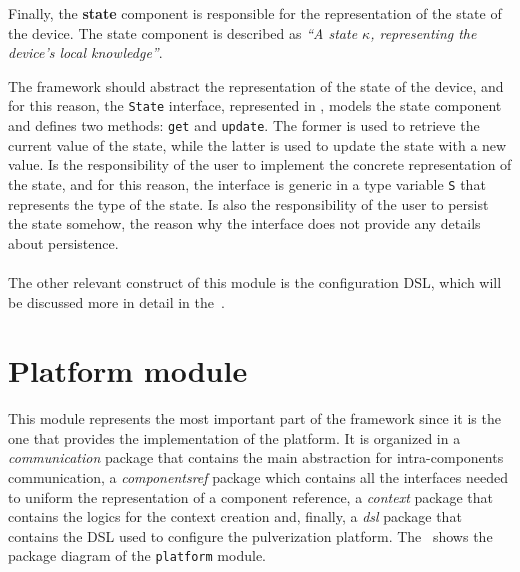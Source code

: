 Finally, the \textbf{state} component is responsible for the representation of the state of the device.
The state component is described as \textit{``A state $\kappa$, representing the device's local knowledge''}.



The framework should abstract the representation of the state of the device, and for this reason, the \texttt{State} interface, represented in
, models the state component and defines two methods: \texttt{get} and \texttt{update}.
The former is used to retrieve the current value of the state, while the latter is used to update the state with a new value.
Is the responsibility of the user to implement the concrete representation of the state, and for this reason, the interface is generic in a type
variable \texttt{S} that represents the type of the state. Is also the responsibility of the user to persist the state somehow, the reason why the
interface does not provide any details about persistence.

\paragraph*{}

The other relevant construct of this module is the configuration DSL, which will be discussed more in detail in the~.


\section{Platform module}
\label{sec:platform-module-impl}

This module represents the most important part of the framework since it is the one that provides the implementation of the platform.
It is organized in a \emph{communication} package that contains the main abstraction for intra-components communication, a \emph{componentsref}
package which contains all the interfaces needed to uniform the representation of a component reference, a \emph{context} package that contains the
logics for the context creation and, finally, a \emph{dsl} package that contains the DSL used to configure the pulverization platform.
The~ shows the package diagram of the \texttt{platform} module.

